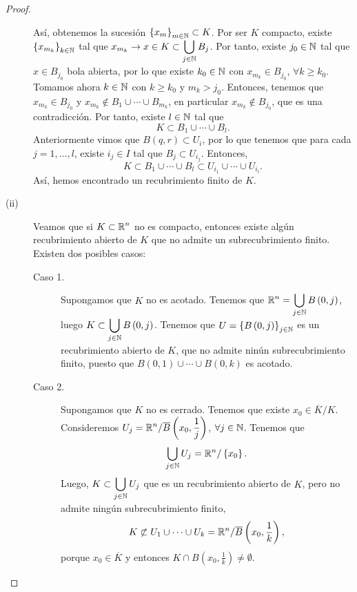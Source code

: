 \begin{proof}
\begin{description}
\begin{itemize}
		\end{itemize}
		Así, obtenemos la sucesión $\displaystyle \left\{ x_{m}\right\} _{m\in\mathbb{N}} \subset K $. Por ser $\displaystyle K $ compacto, existe $\displaystyle \left\{ x_{m_{k}}\right\} _{k \in \mathbb{N}} $ tal que $\displaystyle x_{m_{k}} \to x \in K \subset \bigcup_{j \in \mathbb{N}}B_{j} $. 
Por tanto, existe $\displaystyle j_{0} \in \mathbb{N} $ tal que $\displaystyle x \in B_{j_{0}} $ bola abierta, por lo que existe $\displaystyle k_{0} \in \mathbb{N} $ con $\displaystyle x_{m_{k}} \in B_{j_{0}} $, $\displaystyle \forall k \geq k_{0} $.
Tomamos ahora $\displaystyle k \in \mathbb{N} $ con $\displaystyle k \geq k_{0} $ y $\displaystyle m_{k} > j_{0} $. Entonces, tenemos que $\displaystyle x_{m_{k}} \in B_{j_{0}} $ y $\displaystyle x_{m_{k}} \not\in B_{1} \cup \cdots \cup B_{m_{k}} $, en particular $\displaystyle x_{m_{k}} \not\in B_{j_{0}} $, que es una contradicción. 
Por tanto, existe $\displaystyle l \in \mathbb{N} $ tal que 
\[K \subset B_{1} \cup \cdots \cup B_{l} .\]
Anteriormente vimos que $\displaystyle  B\left(q,r\right) \subset U_{i} $, por lo que tenemos que para cada $\displaystyle j = 1, \ldots, l $, existe $\displaystyle i_{j} \in I $ tal que $\displaystyle B_{j} \subset U_{i_{j}} $. Entonces, 
\[K \subset B_{1} \cup \cdots \cup B_{l} \subset U_{i_{1}} \cup \cdots \cup U_{i_{l}} .\]
Así, hemos encontrado un recubrimiento finito de $\displaystyle K $.
\item[(ii)] Veamos que si $\displaystyle K \subset \mathbb{R}^{n} $ no es compacto, entonces existe algún recubrimiento abierto de $\displaystyle K $ que no admite un subrecubrimiento finito. Existen dos posibles casos:
	\begin{description}
		\item[Caso 1.] Supongamos que $\displaystyle K $ no es acotado. Tenemos que $\displaystyle \mathbb{R}^{n} = \bigcup_{j \in \mathbb{N}}B\left(0,j\right) $, luego $\displaystyle K \subset \bigcup_{j \in \mathbb{N}}B\left(0,j\right) $. Tenemos que $\displaystyle U = \left\{ B\left(0,j\right)\right\} _{j \in \mathbb{N}} $ es un recubrimiento abierto de $\displaystyle K $, que no admite ninún subrecubrimiento finito, puesto que $\displaystyle B\left(0,1\right) \cup \cdots \cup B\left(0,k\right) $ es acotado. 
		\item[Caso 2.] Supongamos que $\displaystyle K $ no es cerrado. Tenemos que existe $\displaystyle x_{0} \in \overline{K}/K $. Consideremos $\displaystyle U_{j} = \mathbb{R}^{n} / \overline{B}\left(x_{0}, \frac{1}{j}\right) $, $\displaystyle \forall j \in \mathbb{N} $. Tenemos que
			\[\bigcup_{ j \in \mathbb{N}}U_{j} = \mathbb{R}^{n} / \left\{ x_{0}\right\}  .\]
	Luego, $\displaystyle K \subset \bigcup_{j \in \mathbb{N}}U_{j} $ que es un recubrimiento abierto de $\displaystyle K $, pero no admite ningún subrecubrimiento finito,
	\[ K \not\subset U_{1} \cup \cdots \cup U_{k} = \mathbb{R}^{n} / \overline{B}\left(x_{0}, \frac{1}{k}\right)  ,\]
	porque $\displaystyle x_{0} \in \overline{K} $ y entonces $\displaystyle K \cap B\left(x_{0}, \frac{1}{k}\right)\neq \emptyset $.
	\end{description}
\end{description}
\end{proof}
